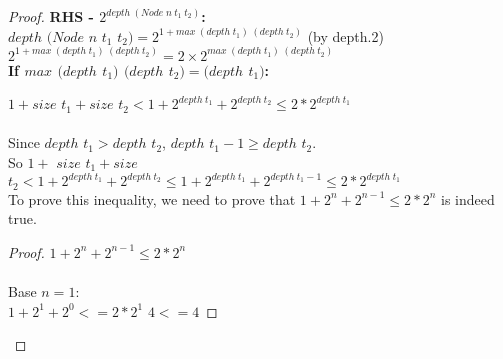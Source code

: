 \documentclass[paper=a4, fontsize=11pt]{scrartcl} %
\numberwithin{equation}{section} %
\numberwithin{figure}{section} %
\numberwithin{table}{section} %
\begin{document}
\begin{proof}
\textbf{RHS - $2^{depth \hspace{3pt}(Node\hspace{3pt} n\hspace{3pt} t_1\hspace{3pt} t_2)}$:}\\

 $depth$ $(Node$ $n$ $t_1$ $t_2) = 2^{1 + max \hspace{3pt}(depth\hspace{3pt} t_1)\hspace{3pt} (depth\hspace{3pt} t_2)}$   \hspace{135pt}    (by depth.2)\\
$2^{1 + max \hspace{3pt}(depth\hspace{3pt} t_1) \hspace{3pt}(depth\hspace{3pt} t_2)} = 2 \times 2^{max\hspace{3pt} (depth\hspace{3pt} t_1)\hspace{3pt} (depth\hspace{3pt} t_2)}$\\

\textbf{If $max$ $(depth$ $t_1)$ $(depth$ $t_2) = (depth$ $t_1)$:}

 $1 + size$ $t_1 + size$ $t_2 < 1 + 2^{depth\hspace{3pt} t_1} + 2^{depth\hspace{3pt} t_2} \leq 2 * 2^{depth\hspace{3pt} t_1}$\\
\\
Since $depth$ $t_1 > depth$ $t_2$, $depth$ $t_1 - 1 \geq depth$ $t_2$.\\
So $1 +$ $size$ $t_1 + size$ $t_2 < 1 + 2^{depth \hspace{3pt} t_1} + 2^{depth \hspace{3pt} t_2} \leq 1 + 2^{depth \hspace{3pt} t_1} + 2^{depth \hspace{3pt} t_1 - 1} \leq 2 * 2^{depth \hspace{3pt} t_1}$\\

To prove this inequality, we need to prove that $1 + 2^n + 2^{n - 1}\leq 2 * 2^n$ is indeed true.\\

\begin{proof}
$1 + 2^n + 2^{n - 1} \leq 2 * 2^n$\\
\\
 Base $n = 1:$\\
 $1 + 2^1 + 2^0 <= 2*2^1$
 $4 <= 4$


\end{proof}
\end{proof}
\end{document}

